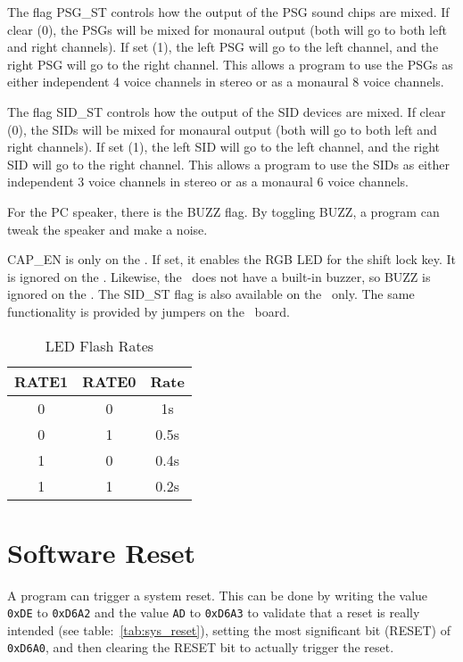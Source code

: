 The flag PSG\_ST controls how the output of the PSG sound chips are mixed. If clear (0), the PSGs will be mixed for monaural output (both will go to both left and right channels). If set (1), the left PSG will go to the left channel, and the right PSG will go to the right channel. This allows a program to use the PSGs as either independent 4 voice channels in stereo or as a monaural 8 voice channels.

The flag SID\_ST controls how the output of the SID devices are mixed. If clear (0), the SIDs will be mixed for monaural output (both will go to both left and right channels). If set (1), the left SID will go to the left channel, and the right SID will go to the right channel. This allows a program to use the SIDs as either independent 3 voice channels in stereo or as a monaural 6 voice channels.

For the PC speaker, there is the BUZZ flag. By toggling BUZZ, a program can tweak the speaker and make a noise.

\begin{note}
    CAP\_EN is only on the \fk. If set, it enables the RGB LED for the shift lock key. It is ignored on the \jr.
    Likewise, the \fk\ does not have a built-in buzzer, so BUZZ is ignored on the \fk. The SID\_ST flag is also available on the \fk\ only. The same functionality is provided by jumpers on the \fjr\ board.
\end{note}

\begin{table}[ht]
    \begin{center}
        \begin{tabular}{|c|c|c|} \hline
            RATE1 & RATE0 & Rate \\\hline\hline
            0 & 0 & 1s \\ \hline
            0 & 1 & 0.5s \\ \hline
            1 & 0 & 0.4s \\ \hline
            1 & 1 & 0.2s \\ \hline
        \end{tabular}
    \end{center}
    \caption{LED Flash Rates}
    \label{tab:led_rates}
\end{table}

\section*{Software Reset}

A program can trigger a system reset. This can be done by writing the value \verb+0xDE+ to \verb+0xD6A2+ and the value \verb+AD+ to \verb+0xD6A3+ to validate that a reset is really intended (see table:~\ref{tab:sys_reset}), setting the most significant bit (RESET) of \verb+0xD6A0+, and then clearing the RESET bit to actually trigger the reset.

